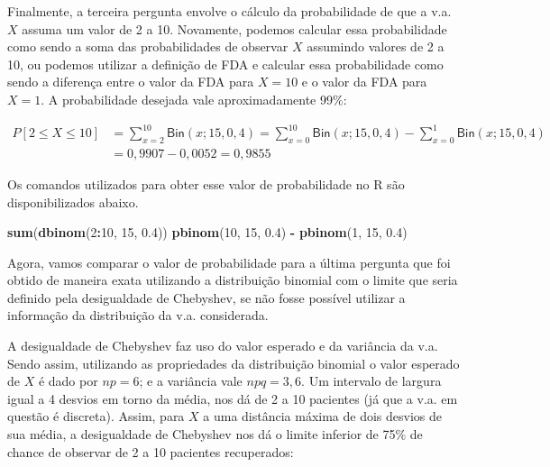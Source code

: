 \documentclass[
]{book}
\newenvironment{Shaded}{\begin{snugshade}}{\end{snugshade}}
\newcommand{\DecValTok}[1]{\textcolor[rgb]{0.00,0.00,0.81}{#1}}
\newcommand{\FloatTok}[1]{\textcolor[rgb]{0.00,0.00,0.81}{#1}}
\newcommand{\KeywordTok}[1]{\textcolor[rgb]{0.13,0.29,0.53}{\textbf{#1}}}
\newcommand{\NormalTok}[1]{#1}
\newcommand{\OperatorTok}[1]{\textcolor[rgb]{0.81,0.36,0.00}{\textbf{#1}}}
\newcommand{\StringTok}[1]{\textcolor[rgb]{0.31,0.60,0.02}{#1}}
\theoremstyle{definition}
\theoremstyle{definition}
\theoremstyle{definition}
\theoremstyle{remark}
\begin{document}
Finalmente, a terceira pergunta envolve o cálculo da probabilidade de que a v.a. \(X\) assuma um valor de 2 a 10. Novamente, podemos calcular essa probabilidade como sendo a soma das probabilidades de observar \(X\) assumindo valores de 2 a 10, ou podemos utilizar a definição de FDA e calcular essa probabilidade como sendo a diferença entre o valor da FDA para \(X=10\) e o valor da FDA para \(X=1\). A probabilidade desejada vale aproximadamente 99\%:

\begin{align*}
  P[2 \leq X \leq 10] 
  &= \sum_{x=2}^{10}\textsf{Bin}(x; 15, 0,4) 
   = \sum_{x=0}^{10}\textsf{Bin}(x; 15, 0,4) - \sum_{x=0}^{1}\textsf{Bin}(x; 15, 0,4)\\
  &= 0,9907 - 0,0052 = 0,9855
\end{align*}

Os comandos utilizados para obter esse valor de probabilidade no R são disponibilizados abaixo.

\begin{Shaded}
\begin{Highlighting}[]
\KeywordTok{sum}\NormalTok{(}\KeywordTok{dbinom}\NormalTok{(}\DecValTok{2}\OperatorTok{:}\DecValTok{10}\NormalTok{, }\DecValTok{15}\NormalTok{, }\FloatTok{0.4}\NormalTok{))}
\KeywordTok{pbinom}\NormalTok{(}\DecValTok{10}\NormalTok{, }\DecValTok{15}\NormalTok{, }\FloatTok{0.4}\NormalTok{) }\OperatorTok{-}\StringTok{ }\KeywordTok{pbinom}\NormalTok{(}\DecValTok{1}\NormalTok{, }\DecValTok{15}\NormalTok{, }\FloatTok{0.4}\NormalTok{)}
\end{Highlighting}
\end{Shaded}

Agora, vamos comparar o valor de probabilidade para a última pergunta que foi obtido de maneira exata utilizando a distribuição binomial com o limite que seria definido pela desigualdade de Chebyshev, se não fosse possível utilizar a informação da distribuição da v.a. considerada.

A desigualdade de Chebyshev faz uso do valor esperado e da variância da v.a. Sendo assim, utilizando as propriedades da distribuição binomial o valor esperado de \(X\) é dado por \(np = 6\); e a variância vale \(npq = 3,6\). Um intervalo de largura igual a 4 desvios em torno da média, nos dá de 2 a 10 pacientes (já que a v.a. em questão é discreta). Assim, para \(X\) a uma distância máxima de dois desvios de sua média, a desigualdade de Chebyshev nos dá o limite inferior de 75\% de chance de observar de 2 a 10 pacientes recuperados:
\end{document}
